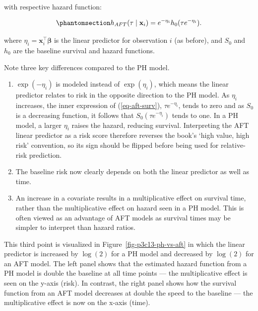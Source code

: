 \documentclass[
  letterpaper,
  krantz2]{style/krantz}
\providecommand{\tightlist}{%
  \setlength{\itemsep}{0pt}\setlength{\parskip}{0pt}}
\begin{document}
with respective hazard function:

\begin{equation}\phantomsection\label{eq-aft-haz}{
h_{AFT}(\tau \mid \mathbf{x}_i) = e^{-\eta_i} h_0(\tau e^{-\eta_i}).
}\end{equation}

where \(\eta_i = \mathbf{x}_i^\top\boldsymbol{\beta}\) is the linear
predictor for observation \(i\) (as before), and \(S_0\) and \(h_0\) are
the baseline survival and hazard functions.

Note three key differences compared to the PH model.

\begin{enumerate}
\def\labelenumi{\arabic{enumi}.}
\tightlist
\item
  \(\exp(-\eta_i)\) is modeled instead of \(\exp(\eta_i)\), which means
  the linear predictor relates to risk in the opposite direction to the
  PH model. As \(\eta_i\) increases, the inner expression of
  (\ref{eq-aft-surv}), \(\tau e^{-\eta_i}\), tends to zero and as
  \(S_0\) is a decreasing function, it follows that
  \(S_0(\tau e^{-\eta_i})\) tends to one. In a PH model, a larger
  \(\eta_i\) raises the hazard, reducing survival. Interpreting the AFT
  linear predictor as a risk score therefore reverses the book's `high
  value, high risk' convention, so its sign should be flipped before
  being used for relative-risk prediction.
\item
  The baseline risk now clearly depends on both the linear predictor as
  well as time.
\item
  An increase in a covariate results in a multiplicative effect on
  survival time, rather than the multiplicative effect on hazard seen in
  a PH model. This is often viewed as an advantage of AFT models as
  survival times may be simpler to interpret than hazard ratios.
\end{enumerate}

This third point is visualized in Figure~\ref{fig-p3c13-ph-vs-aft} in
which the linear predictor is increased by \(\log(2)\) for a PH model
and decreased by \(\log(2)\) for an AFT model. The left panel shows that
the estimated hazard function from a PH model is double the baseline at
all time points --- the multiplicative effect is seen on the y-axis
(risk). In contrast, the right panel shows how the survival function
from an AFT model decreases at double the speed to the baseline --- the
multiplicative effect is now on the x-axis (time).
\end{document}
